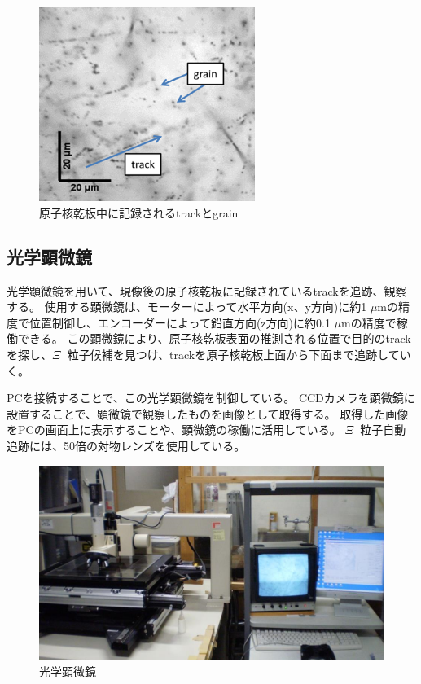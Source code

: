\documentclass[12pt,a4paper]{jarticle}
\begin{document}
\begin{figure}[htbp]
 \centering
      \includegraphics[width=70mm]{grainfog.png}
 \caption{原子核乾板中に記録されるtrackとgrain\label{fig:grain_track}}
\end{figure}
\subsection{光学顕微鏡}
光学顕微鏡を用いて、現像後の原子核乾板に記録されているtrackを追跡、観察する。
使用する顕微鏡は、モーターによって水平方向(x、y方向)に約1 $\mu$mの精度で位置制御し、エンコーダーによって鉛直方向(z方向)に約0.1 $\mu$mの精度で稼働できる。
この顕微鏡により、原子核乾板表面の推測される位置で目的のtrackを探し、$\Xi$$^-$粒子候補を見つけ、trackを原子核乾板上面から下面まで追跡していく。
\par
PCを接続することで、この光学顕微鏡を制御している。
CCDカメラを顕微鏡に設置することで、顕微鏡で観察したものを画像として取得する。
取得した画像をPCの画面上に表示することや、顕微鏡の稼働に活用している。
$\Xi$$^-$粒子自動追跡には、50倍の対物レンズを使用している。
\begin{figure}[htbp]
  \centering
     \includegraphics[width=140mm]{microscope.png}
  \caption{光学顕微鏡\label{fig:microscope}}
\end{figure}
\newpage
\end{document}
